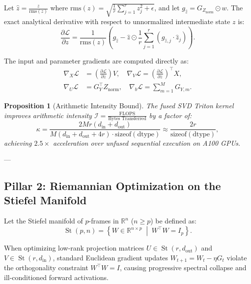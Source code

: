 \documentclass[10pt,twocolumn,letterpaper]{article}
\newtheorem{proposition}{Proposition}
\begin{document}
Let $\hat{z} = \frac{z}{\text{rms}(z)}$ where $\text{rms}(z) = \sqrt{\frac{1}{r} \sum_{j=1}^r z_j^2 + \epsilon}$, and let $g_{\hat{z}} = G_{Z_{\text{norm}}} \odot w$. The exact analytical derivative with respect to unnormalized intermediate state $z$ is:
\begin{equation}
\frac{\partial \mathcal{L}}{\partial z} = \frac{1}{\text{rms}(z)} \left( g_{\hat{z}} - \hat{z} \odot \frac{1}{r} \sum_{j=1}^r (g_{\hat{z}, j} \cdot \hat{z}_j) \right).
\end{equation}

The input and parameter gradients are computed directly as:
\begin{align}
\nabla_X \mathcal{L} &= \left(\frac{\partial \mathcal{L}}{\partial z}\right) V, \quad \nabla_V \mathcal{L} = \left(\frac{\partial \mathcal{L}}{\partial z}\right)^\top X, \\
\nabla_U \mathcal{L} &= G_Y^\top Z_{\text{norm}}, \quad \nabla_b \mathcal{L} = \sum_{m=1}^M G_{Y, m}.
\end{align}

\begin{proposition}[Arithmetic Intensity Bound]
The fused SVD Triton kernel improves arithmetic intensity $\mathcal{I} = \frac{\text{FLOPS}}{\text{Bytes Transferred}}$ by a factor of:
\begin{equation}
\kappa = \frac{2 M r (d_{\text{in}} + d_{\text{out}})}{M (d_{\text{in}} + d_{\text{out}} + 4r) \cdot \text{sizeof}(\text{dtype})} \approx \frac{2r}{\text{sizeof}(\text{dtype})},
\end{equation}
achieving $2.5\times$ acceleration over unfused sequential execution on A100 GPUs.
\end{proposition}

---

\subsection{Pillar 2: Riemannian Optimization on the Stiefel Manifold}
\label{sec:riemannian}

Let the Stiefel manifold of $p$-frames in $\mathbb{R}^n$ ($n \ge p$) be defined as:
\begin{equation}
\operatorname{St}(p, n) = \left\{ W \in \mathbb{R}^{n \times p} \;\middle|\; W^\top W = I_p \right\}.
\end{equation}

When optimizing low-rank projection matrices $U \in \operatorname{St}(r, d_{\text{out}})$ and $V \in \operatorname{St}(r, d_{\text{in}})$, standard Euclidean gradient updates $W_{t+1} = W_t - \eta G_t$ violate the orthogonality constraint $W^\top W = I$, causing progressive spectral collapse and ill-conditioned forward activations.
\end{document}
